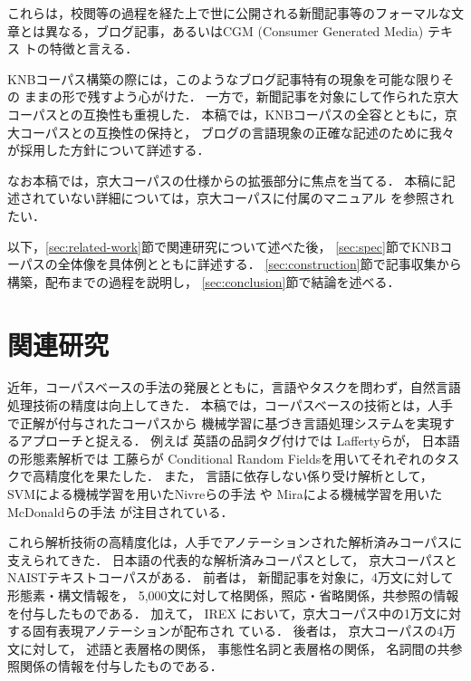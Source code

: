 \documentclass[japanese]{jnlp_JS2.0}
\begin{document}
\setlength{\widelabel}{18pt}

これらは，校閲等の過程を経た上で世に公開される新聞記事等のフォーマルな文
章とは異なる，ブログ記事，あるいはCGM (Consumer Generated Media) テキス
トの特徴と言える．

KNBコーパス構築の際には，このようなブログ記事特有の現象を可能な限りその
ままの形で残すよう心がけた．
一方で，新聞記事を対象にして作られた京大コーパスとの互換性も重視した．
本稿では，KNBコーパスの全容とともに，京大コーパスとの互換性の保持と，
ブログの言語現象の正確な記述のために我々が採用した方針について詳述する．

なお本稿では，京大コーパスの仕様からの拡張部分に焦点を当てる．
本稿に記述されていない詳細については，京大コーパスに付属のマニュアル
\cite{KUCorpus:syn:2000,KUCorpus:rel:2005}
を参照されたい．

以下，\ref{sec:related-work}節で関連研究について述べた後，
\ref{sec:spec}節でKNBコーパスの全体像を具体例とともに詳述する．
\ref{sec:construction}節で記事収集から構築，配布までの過程を説明し，
\ref{sec:conclusion}節で結論を述べる．



\section{関連研究 \label{sec:related-work}}

近年，コーパスベースの手法の発展とともに，言語やタスクを問わず，自然言語
処理技術の精度は向上してきた．
本稿では，コーパスベースの技術とは，人手で正解が付与されたコーパスから
機械学習に基づき言語処理システムを実現するアプローチと捉える．
例えば
英語の品詞タグ付けでは
Laffertyら\cite{Lafferty:McCallum:Pereira:2001}が，
日本語の形態素解析では
工藤ら\cite{Kudo:Yamamoto:Matsumoto:2004}が
Conditional Random Fieldsを用いてそれぞれのタスクで高精度化を果たした．
また，
言語に依存しない係り受け解析として，
SVMによる機械学習を用いたNivreらの手法
\cite{Nivre:Hall:Nilsson:senEryigit:Marinov:2006}や
Miraによる機械学習を用いたMcDonaldらの手法
\cite{McDonald:Lerman:Pereira:2006}が注目されている．

これら解析技術の高精度化は，人手でアノテーションされた解析済みコーパスに
支えられてきた．
日本語の代表的な解析済みコーパスとして，
京大コーパスと
NAISTテキストコーパス\cite{NAISTCorpus:2007}がある．
前者は，
新聞記事を対象に，4万文に対して形態素・構文情報を，
5,000文に対して格関係，照応・省略関係，共参照の情報を付与したものである．
加えて，
IREX \cite{IREX:2000}
において，京大コーパス中の1万文に対する固有表現アノテーションが配布され
ている．
後者は，
京大コーパスの4万文に対して，
述語と表層格の関係，
事態性名詞と表層格の関係，
名詞間の共参照関係の情報を付与したものである．
\end{document}
